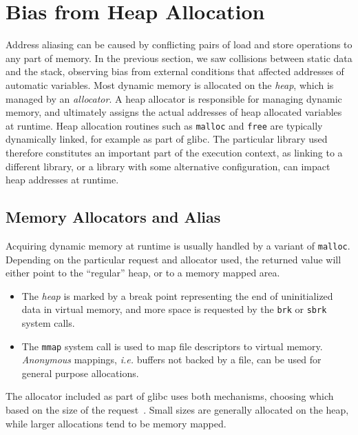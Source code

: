 \documentclass[10pt, conference, compsocconf]{IEEEtran}
\begin{document}
\section{Bias from Heap Allocation}
\label{sec:heap}
Address aliasing can be caused by conflicting pairs of load and store operations to any part of memory.
In the previous section, we saw collisions between static data and the stack, observing bias from external conditions that affected addresses of automatic variables.
Most dynamic memory is allocated on the \emph{heap}, which is managed by an \emph{allocator}.
A heap allocator is responsible for managing dynamic memory, and ultimately assigns the actual addresses of heap allocated variables at runtime.
Heap allocation routines such as \texttt{malloc} and \texttt{free} are typically dynamically linked, for example as part of glibc.
The particular library used therefore constitutes an important part of the execution context, as linking to a different library, or a library with some alternative configuration, can impact heap addresses at runtime.

\subsection{Memory Allocators and Alias}
Acquiring dynamic memory at runtime is usually handled by a variant of \texttt{malloc}.
Depending on the particular request and allocator used, the returned value will either point to the ``regular'' heap, or to a memory mapped area.
\begin{itemize}
  \item The \emph{heap} is marked by a break point representing the end of uninitialized data in virtual memory, and more space is requested by the \texttt{brk} or \texttt{sbrk} system calls.
  \item The \texttt{mmap} system call is used to map file descriptors to virtual memory. \emph{Anonymous} mappings, \emph{i.e.} buffers not backed by a file, can be used for general purpose allocations.
\end{itemize}
The allocator included as part of glibc uses both mechanisms, choosing which based on the size of the request~\cite{GlibcManual}.
Small sizes are generally allocated on the heap, while larger allocations tend to be memory mapped.
\end{document}
